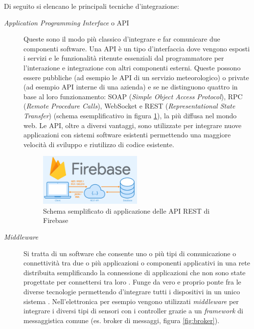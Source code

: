 Di seguito si elencano le principali tecniche d'integrazione:

\begin{description}
    \item [\textit{Application Programming Interface} o API] {Queste sono il modo più classico d'integrare e far comunicare due componenti software. Una API è un tipo d'interfaccia dove vengono esposti i servizi e le funzionalità ritenute essenziali dal programmatore per l'interazione e integrazione con altri componenti esterni.
    Queste possono essere pubbliche (ad esempio le API di un servizio meteorologico) o private (ad esempio API interne di una azienda) e se ne distinguono quattro in base al loro funzionamento: SOAP (\textit{Simple Object Access Protocol}), RPC (\textit{Remote Procedure Calls}), WebSocket e REST (\textit{Representational State Transfer}) (schema esemplificativo in figura \ref{fig:firebaseAPI}), la più diffusa nel mondo web.
    Le API, oltre a diversi vantaggi, sono utilizzate per integrare nuove applicazioni con sistemi software esistenti permettendo una maggiore velocità di sviluppo e riutilizzo di codice esistente.}

    \begin{figure} [h]
        \centering
        \includegraphics[width=0.5\textwidth]{img/api-firebase.png}
        \caption{Schema semplificato di applicazione delle API REST di Firebase}
        \label{fig:firebaseAPI}
    \end{figure}
    
    \item [\textit{Middleware}] Si tratta di un software che consente uno o più tipi di comunicazione o connettività tra due o più applicazioni o componenti applicativi in una rete distribuita semplificando la connessione di applicazioni che non sono state progettate per connettersi tra loro \cite[IBM]{ibm_middleware}. Funge da vero e proprio ponte fra le diverse tecnologie permettendo d'integrare tutti i dispositivi in un unico sistema \cite{aws}. Nell'elettronica per esempio vengono utilizzati \textit{middleware} per integrare i diversi tipi di sensori con i controller grazie a un \textit{framework} di messaggistica comune (es. broker di messaggi, figura \ref{fig:broker}).
 

\end{description}
